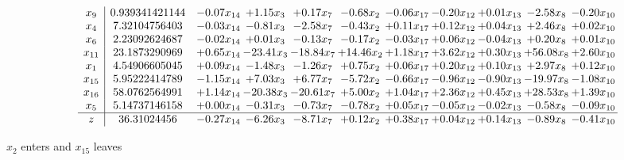 \documentclass[9pt]{article}
\begin{document}
 \[\begin{array}{c| c c@{\hskip 2pt} c@{\hskip 2pt} c@{\hskip 2pt} c@{\hskip 2pt} c@{\hskip 2pt} c@{\hskip 2pt} c@{\hskip 2pt} c@{\hskip 2pt} c@{\hskip 2pt} }
 x_{9}   &  0.939341421144 & -0.07 x_{14} & +  1.15 x_{3} & +  0.17 x_{7} & -0.68 x_{2} & -0.06 x_{17} & -0.20 x_{12} & +  0.01 x_{13} & -2.58 x_{8} & -0.20 x_{10}\\
 x_{4}   &  7.32104756403 & -0.03 x_{14} & -0.81 x_{3} & -2.58 x_{7} & -0.43 x_{2} & +  0.11 x_{17} & +  0.12 x_{12} & +  0.04 x_{13} & +  2.46 x_{8} & +  0.02 x_{10}\\
 x_{6}   &  2.23092624687 & -0.02 x_{14} & +  0.01 x_{3} & -0.13 x_{7} & -0.17 x_{2} & -0.03 x_{17} & +  0.06 x_{12} & -0.04 x_{13} & +  0.20 x_{8} & +  0.01 x_{10}\\
 x_{11}   &  23.1873290969 & +  0.65 x_{14} & -23.41 x_{3} & -18.84 x_{7} & + 14.46 x_{2} & +  1.18 x_{17} & +  3.62 x_{12} & +  0.30 x_{13} & + 56.08 x_{8} & +  2.60 x_{10}\\
 x_{1}   &  4.54906605045 & +  0.09 x_{14} & -1.48 x_{3} & -1.26 x_{7} & +  0.75 x_{2} & +  0.06 x_{17} & +  0.20 x_{12} & +  0.10 x_{13} & +  2.97 x_{8} & +  0.12 x_{10}\\
 x_{15}   &  5.95222414789 & -1.15 x_{14} & +  7.03 x_{3} & +  6.77 x_{7} & -5.72 x_{2} & -0.66 x_{17} & -0.96 x_{12} & -0.90 x_{13} & -19.97 x_{8} & -1.08 x_{10}\\
 x_{16}   &  58.0762564991 & +  1.14 x_{14} & -20.38 x_{3} & -20.61 x_{7} & +  5.00 x_{2} & +  1.04 x_{17} & +  2.36 x_{12} & +  0.45 x_{13} & + 28.53 x_{8} & +  1.39 x_{10}\\
 x_{5}   &  5.14737146158 & +  0.00 x_{14} & -0.31 x_{3} & -0.73 x_{7} & -0.78 x_{2} & +  0.05 x_{17} & -0.05 x_{12} & -0.02 x_{13} & -0.58 x_{8} & -0.09 x_{10}\\
\hline
z    &  36.31024456 & -0.27 x_{14} & -6.26 x_{3} & -8.71 x_{7} & +  0.12 x_{2} & +  0.38 x_{17} & +  0.04 x_{12} & +  0.14 x_{13} & -0.89 x_{8} & -0.41 x_{10}\\
\end{array}\]


 $ x_{2} $ enters and $ x_{15} $ leaves 
\end{document}
